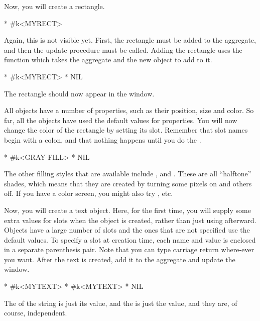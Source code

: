 Now, you will create a rectangle.
\begin{programexample}
* 
\#k<MYRECT>
\end{programexample}

Again, this is not visible yet.  First, the rectangle must be added to the
aggregate, and then the update procedure must be called.  Adding the
rectangle uses the function
 which takes the aggregate and the new object to add to
it.
\begin{programexample}
* 
\#k<MYRECT>
* 
NIL
\end{programexample}

The rectangle should now appear in the window.

All objects have a number of properties,
such as their position, size and color.  So far, all the objects have used
the default values for properties.  You will now change the color of the
rectangle by setting its  slot.  Remember that slot
names begin with a colon, and that nothing happens until you do the
.
\begin{programexample}
* 
\#k<GRAY-FILL>
* 
NIL
\end{programexample}

The other filling styles that are available include , and
.  These are all ``halftone'' shades, which
means that they are created by turning some pixels on and others off.
If you have a color screen, you might also try , etc.

Now, you will create a text object.  Here, for the first time, you will
supply some extra values for slots when the object is created, rather than
just using  afterward.  Objects have a large number of slots
and the ones that are not specified use the default values.
To specify a slot at creation time, each name and value is
enclosed in a separate parenthesis pair.  Note that you can type carriage
return where-ever you want.  After the text is created, add it to the
aggregate and update the window.
\begin{programexample}
* 
\#k<MYTEXT>
* 
\#k<MYTEXT>
* 
NIL
\end{programexample}
The  of the string is just its  value, and the  is
just the  value, and they are, of course, independent.

